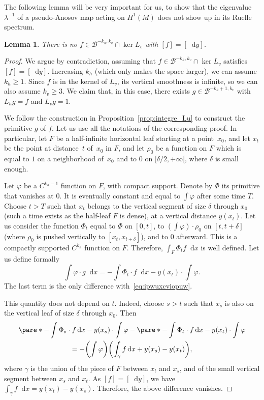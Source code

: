 \documentclass[10pt]{amsart}
\newcommand{\boB}{\mathcal{B}}
\newcommand{\dd}{\mathop{}\!\mathrm{d}}
\newcommand{\paregg}[1]{\biggl(#1\biggr)}
\let\phi\varphi
\newtheorem{lem}[thm]{Lemma}
\theoremstyle{definition}
\numberwithin{equation}{section}
\begin{document}
The following lemma will be very important for us, to show that the
eigenvalue $\lambda^{-1}$ of a pseudo-Anosov map acting on $H^1(M)$ does not
show up in its Ruelle spectrum.

\begin{lem}
\label{lem:Lv_preimage_1} There is no $f \in \boB^{-k_h, k_v} \cap \ker L_v$
with $[f] = [\dd y]$.
\end{lem}
\begin{proof}
We argue by contradiction, assuming that $f \in \boB^{-k_h, k_v} \cap \ker
L_v$ satisfies $[f] = [\dd y]$. Increasing $k_h$ (which only makes the space
larger), we can assume $k_h \geq 1$. Since $f$ is in the kernel of $L_v$, its
vertical smoothness is infinite, so we can also assume $k_v\geq 3$. We claim
that, in this case, there exists $g \in \boB^{-k_h+1, k_v}$ with $L_h g = f$
and $L_v g = 1$.

We follow the construction in Proposition~\ref{prop:integre_Lu} to construct
the primitive $g$ of $f$. Let us use all the notations of the corresponding
proof. In particular, let $F$ be a half-infinite horizontal leaf starting at
a point~$x_0$, and let $x_t$ be the point at distance~$t$ of~$x_0$ in $F$,
and let $\rho_0$ be a function on $F$ which is equal to $1$ on a neighborhood
of~$x_0$ and to $0$ on $[\delta/2, +\infty[$, where $\delta$ is small enough.

Let $\phi$ be a $C^{k_h-1}$ function on $F$, with compact support. Denote by
$\Phi$ its primitive that vanishes at $0$. It is eventually constant and
equal to $\int \phi$ after some time $T$. Choose $t>T$ such that $x_t$
belongs to the vertical segment of size $\delta$ through $x_0$ (such a time
exists as the half-leaf $F$ is dense), at a vertical distance $y(x_t)$. Let
us consider the function $\Phi_t$ equal to $\Phi$ on $[0,t]$, to $(\int \phi)
\cdot \rho_0$ on $[t, t+\delta]$ (where $\rho_0$ is pushed vertically to
$[x_t, x_{t+\delta}]$), and to $0$ afterward. This is a compactly supported
$C^{k_h}$ function on $F$. Therefore, $\int_F \Phi_t f \dd x$ is well
defined. Let us define formally\vspace*{-3pt}
\begin{equation}
\label{eq:puiowxuiopv}
\int \phi\cdot g \dd x = -\int \Phi_t \cdot f \dd x - y(x_t) \cdot \int \phi.
\end{equation}
The last term is the only difference with~\eqref{eq:ipwuxcviopuw}.

This quantity does not depend on $t$. Indeed, choose $s>t$ such that $x_s$ is
also on the vertical leaf of size $\delta$ through $x_0$. Then\vspace*{-3pt}
\begin{multline*}
\pare*{-\int \Phi_s \cdot f \dd x - y(x_s) \cdot \int \phi} - \pare*{-\int \Phi_t \cdot f \dd x - y(x_t) \cdot \int \phi}
\\ = -\paregg{\int \phi} \paregg{\int_\gamma f \dd x + y(x_s) - y(x_t)},
\end{multline*}
where $\gamma$ is the union of the piece of $F$ between $x_t$ and $x_s$, and
of the small vertical segment between $x_s$ and $x_t$. As $[f] = [\dd y]$, we
have $\int_\gamma f \dd x = y(x_t) - y(x_s)$. Therefore, the above difference
vanishes.


\end{proof}
\end{document}
